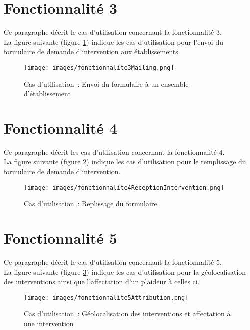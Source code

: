 \documentclass[asi, sansVersion]{picInsa}
\begin{document}
\section{Fonctionnalité 3}
Ce paragraphe décrit le cas d'utilisation concernant la fonctionnalité 3. \\

La figure suivante (figure \ref{diagrammeCasUtilisation3}) indique les cas d'utilisation pour l'envoi du formulaire de demande d'intervention aux établissements.
\begin{figure}[H]
	\centering
	\texttt{[image: images/fonctionnalite3Mailing.png]}
	\caption{Cas d'utilisation~: Envoi du formulaire à un ensemble d'établissement}
	\label{diagrammeCasUtilisation3}
\end{figure}

\section{Fonctionnalité 4}
Ce paragraphe décrit les cas d'utilisation concernant la fonctionnalité 4. \\

La figure suivante (figure \ref{diagrammeCasUtilisation4}) indique les cas d'utilisation pour le remplissage du formulaire de demande d'intervention.
\begin{figure}[H]
	\centering
	\texttt{[image: images/fonctionnalite4ReceptionIntervention.png]}
	\caption{Cas d'utilisation~: Replissage du formulaire}
	\label{diagrammeCasUtilisation4}
\end{figure}

\section{Fonctionnalité 5}
Ce paragraphe décrit le cas d'utilisation concernant la fonctionnalité 5. \\

La figure suivante (figure \ref{diagrammeCasUtilisation5}) indique les cas d'utilisation pour la géolocalisation des interventions ainsi que l'affectation d'un plaideur à celles ci. \\
\begin{figure}[H]
	\centering
	\texttt{[image: images/fonctionnalite5Attribution.png]}
	\caption{Cas d'utilisation~: Géolocalisation des interventions et affectation à une intervention}
	\label{diagrammeCasUtilisation5}
\end{figure}
\end{document}
